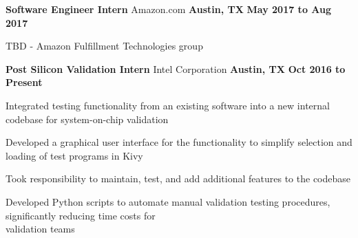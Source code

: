 \begin{cventries}
  \cventry
    {\normalsize \textbf{Software Engineer Intern}}
    {\large Amazon.com}
    {\normalsize \textbf{Austin, TX}}
    {\normalsize \textbf{May 2017 to Aug 2017}}
    {
      \begin{cvitems}
        \item {\normalsize TBD - Amazon Fulfillment Technologies group}
      \end{cvitems}
    }
  \cventry
    {\normalsize \textbf{Post Silicon Validation Intern}}
    {\large Intel Corporation}
    {\normalsize \textbf{Austin, TX}}
    {\normalsize \textbf{Oct 2016 to Present}}
    {
      \begin{cvitems}
        \item {\normalsize Integrated testing functionality from an existing software into a new internal codebase for system-on-chip validation}
        \item {\normalsize Developed a graphical user interface for the functionality to simplify selection and loading of test programs in Kivy}
        \item {\normalsize Took responsibility to maintain, test, and add additional features to the codebase}
        \item {\normalsize Developed Python scripts to automate manual validation testing procedures, significantly reducing time costs for \\validation teams}
      \end{cvitems}
    }
\end{cventries}
